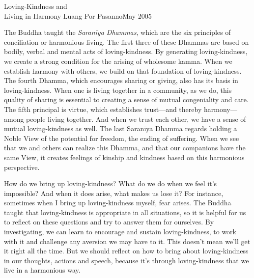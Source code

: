 {Loving-Kindness and\\Living in Harmony}
{Luang Por Pasanno}{May 2005}

The Buddha taught the \emph{Saranīya Dhammas}, which are the six 
principles of conciliation or harmonious living. The first three of 
these Dhammas are based on bodily, verbal and mental acts of 
loving-kindness. By generating loving-kindness, we create a strong 
condition for the arising of wholesome kamma. When we establish harmony 
with others, we build on that foundation of loving-kindness. The fourth 
Dhamma, which encourages sharing or giving, also has its basis in 
loving-kindness. When one is living together in a community, as we do, 
this quality of sharing is essential to creating a sense of mutual 
congeniality and care. The fifth principal is virtue, which establishes 
trust---and thereby harmony---among people living together. And when we 
trust each other, we have a sense of mutual loving-kindness as well. 
The last Saranīya Dhamma regards holding a Noble View of the potential 
for freedom, the ending of suffering. When we see that we and others 
can realize this Dhamma, and that our companions have the same View, it 
creates feelings of kinship and kindness based on this harmonious 
perspective.

How do we bring up loving-kindness? What do we do when we feel it's 
impossible? And when it does arise, what makes us lose it? For 
instance, sometimes when I bring up loving-kindness myself, fear 
arises. The Buddha taught that loving-kindness is appropriate in all 
situations, so it is helpful for us to reflect on these questions and 
try to answer them for ourselves. By investigating, we can learn to 
encourage and sustain loving-kindness, to work with it and challenge 
any aversion we may have to it. This doesn't mean we'll get it right 
all the time. But we should reflect on how to bring about 
loving-kindness in our thoughts, actions and speech, because it's 
through loving-kindness that we live in a harmonious way.

